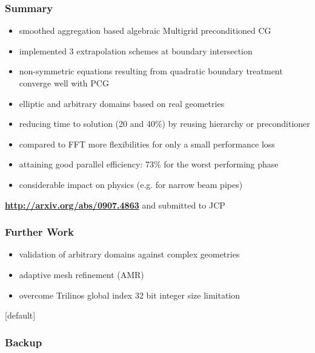 \documentclass[xcolor=pdftex,table,10pt]{beamer}
\begin{document}
    \begin{frame}
		\frametitle{Summary}

		\begin{itemize}
			\item smoothed aggregation based algebraic Multigrid preconditioned CG
			\item implemented 3 extrapolation schemes at boundary intersection
            \item non-symmetric equations resulting from quadratic boundary treatment converge well with PCG
			\item elliptic and arbitrary domains based on real geometries
            \item reducing time to solution (20 and 40\%) by reusing hierarchy or preconditioner
            \item compared to FFT more flexibilities for only a small performance loss
            \item attaining good parallel efficiency: 73\% for the worst performing phase
            \item considerable impact on physics (e.g. for narrow beam pipes)
		\end{itemize}

        \vspace{0.5cm}

        \alert{\textbf{\url{http://arxiv.org/abs/0907.4863}}} and submitted to JCP

    \end{frame}

    \begin{frame}
        \frametitle{Further Work}

		\begin{itemize}
			\item validation of arbitrary domains against complex geometries
			\item adaptive mesh refinement (AMR)
            \item overcome Trilinos global index 32 bit integer size limitation
		\end{itemize}

	\end{frame}

\addtocounter{framenumber}{-16}
[default]

	\begin{frame}
	  	\frametitle{Backup}
		\begin{center}
		\end{center}
	\end{frame}
\end{document}
